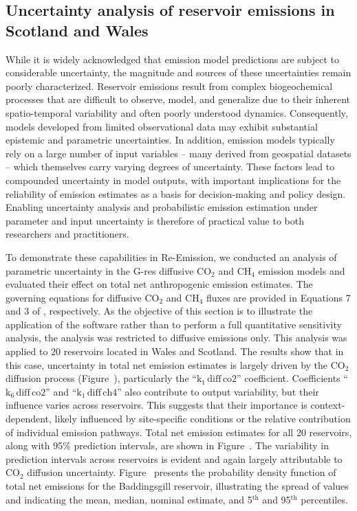 \documentclass[review, authoryear, 1p]{elsarticle} %
\begin{document}
\subsection{Uncertainty analysis of reservoir emissions in Scotland and Wales}
\label{subsec:scotland_wales}

While it is widely acknowledged that emission model predictions are subject to considerable uncertainty, the magnitude and sources of these uncertainties remain poorly characterized. 
Reservoir emissions result from complex biogeochemical processes that are difficult to observe, model, and generalize due to their inherent spatio-temporal variability and often poorly understood dynamics.
Consequently, models developed from limited observational data may exhibit substantial epistemic and parametric uncertainties.
In addition, emission models typically rely on a large number of input variables -- many derived from geospatial datasets -- which themselves carry varying degrees of uncertainty.
These factors lead to compounded uncertainty in model outputs, with important implications for the reliability of emission estimates as a basis for decision-making and policy design.
Enabling uncertainty analysis and probabilistic emission estimation under parameter and input uncertainty is therefore of practical value to both researchers and practitioners.

To demonstrate these capabilities in Re-Emission, we conducted an analysis of parametric uncertainty in the G-res diffusive CO$_2$ and CH$_4$ emission models and evaluated their effect on total net anthropogenic emission estimates. 
The governing equations for diffusive CO$_2$ and CH$_4$ fluxes are provided in Equations 7 and 3 of \cite{Prairie2021}, respectively.
As the objective of this section is to illustrate the application of the software rather than to perform a full quantitative sensitivity analysis, the analysis was restricted to diffusive emissions only.
This analysis was applied to 20 reservoirs located in Wales and Scotland. 
The results show that in this case, uncertainty in total net emission estimates is largely driven by the CO$_2$ diffusion process (Figure~), particularly the ``$\textrm{k}_1\,\textrm{diff}\,\textrm{co2}$'' coefficient. Coefficients ``$\textrm{k}_6\,\textrm{diff}\,\textrm{co2}$'' and ``$\textrm{k}_1\,\textrm{diff}\,\textrm{ch4}$'' also contribute to output variability, but their influence varies across reservoirs. This suggests that their importance is context-dependent, likely influenced by site-specific conditions or the relative contribution of individual emission pathways. 
Total net emission estimates for all 20 reservoirs, along with 95\% prediction intervals, are shown in Figure~.
The variability in prediction intervals across reservoirs is evident and again largely attributable to CO$_2$ diffusion uncertainty.
Figure~ presents the probability density function of total net emissions for the Baddingsgill reservoir, illustrating the spread of values and indicating the mean, median, nominal estimate, and 5$^\textrm{th}$ and 95$^\textrm{th}$ percentiles.
\end{document}
